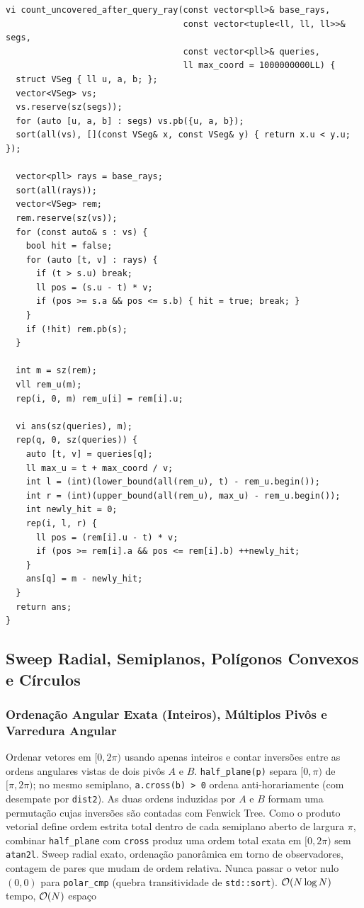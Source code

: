 \begin{lstlisting}
vi count_uncovered_after_query_ray(const vector<pll>& base_rays,
                                   const vector<tuple<ll, ll, ll>>& segs,
                                   const vector<pll>& queries,
                                   ll max_coord = 1000000000LL) {
  struct VSeg { ll u, a, b; };
  vector<VSeg> vs;
  vs.reserve(sz(segs));
  for (auto [u, a, b] : segs) vs.pb({u, a, b});
  sort(all(vs), [](const VSeg& x, const VSeg& y) { return x.u < y.u; });

  vector<pll> rays = base_rays;
  sort(all(rays));
  vector<VSeg> rem;
  rem.reserve(sz(vs));
  for (const auto& s : vs) {
    bool hit = false;
    for (auto [t, v] : rays) {
      if (t > s.u) break;
      ll pos = (s.u - t) * v;
      if (pos >= s.a && pos <= s.b) { hit = true; break; }
    }
    if (!hit) rem.pb(s);
  }

  int m = sz(rem);
  vll rem_u(m);
  rep(i, 0, m) rem_u[i] = rem[i].u;

  vi ans(sz(queries), m);
  rep(q, 0, sz(queries)) {
    auto [t, v] = queries[q];
    ll max_u = t + max_coord / v;
    int l = (int)(lower_bound(all(rem_u), t) - rem_u.begin());
    int r = (int)(upper_bound(all(rem_u), max_u) - rem_u.begin());
    int newly_hit = 0;
    rep(i, l, r) {
      ll pos = (rem[i].u - t) * v;
      if (pos >= rem[i].a && pos <= rem[i].b) ++newly_hit;
    }
    ans[q] = m - newly_hit;
  }
  return ans;
}
\end{lstlisting}

\subsection{Sweep Radial, Semiplanos, Polígonos Convexos e Círculos}

\subsubsection{Ordenação Angular Exata (Inteiros), Múltiplos Pivôs e Varredura Angular}
\algobox
  {Ordenar vetores em $[0, 2\pi)$ usando apenas inteiros e contar inversões entre as ordens angulares vistas de dois pivôs $A$ e $B$.}
  {\texttt{half\_plane(p)} separa $[0, \pi)$ de $[\pi, 2\pi)$; no mesmo semiplano, \texttt{a.cross(b) > 0} ordena anti-horariamente (com desempate por \texttt{dist2}). As duas ordens induzidas por $A$ e $B$ formam uma permutação cujas inversões são contadas com Fenwick Tree.}
  {Como o produto vetorial define ordem estrita total dentro de cada semiplano aberto de largura $\pi$, combinar \texttt{half\_plane} com \texttt{cross} produz uma ordem total exata em $[0, 2\pi)$ sem \texttt{atan2l}.}
  {Sweep radial exato, ordenação panorâmica em torno de observadores, contagem de pares que mudam de ordem relativa.}
  {Nunca passar o vetor nulo $(0, 0)$ para \texttt{polar\_cmp} (quebra transitividade de \texttt{std::sort}).}
  {$\mathcal{O}(N \log N)$ tempo, $\mathcal{O}(N)$ espaço}


